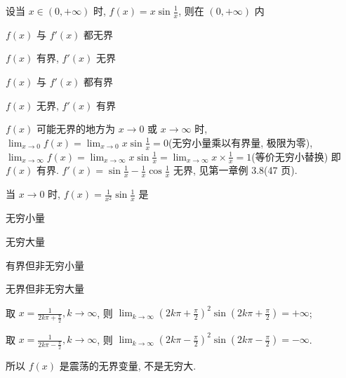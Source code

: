\begin{question}
  设当 $x \in(0,+\infty)$ 时, $f(x) = x \sin \frac{1}{x}$,
  则在 $(0,+\infty)$ 内
  \paren[B]
  \begin{choices}
    \item $f(x)$ 与 $f'(x)$ 都无界
    \item $f(x)$ 有界, $f'(x)$ 无界
    \item $f(x)$ 与 $f'(x)$ 都有界
    \item $f(x)$ 无界, $f'(x)$ 有界
  \end{choices}
\end{question}

\begin{analysis}
  $f(x)$ 可能无界的地方为 $x \to 0$ 或 $x \to \infty$ 时, $\lim_{x \to 0} f(x) = \lim_{x \to 0} x \sin \frac{1}{x} = 0$(无穷小量乘以有界量,
  极限为零),
  $\lim_{x \to \infty} f(x) = \lim_{x \to \infty} x \sin \frac{1}{x} = \lim_{x \to \infty} x \times \frac{1}{x} = 1$(等价无穷小替换)
  即 $f(x)$ 有界.
  $f'(x) = \sin \frac{1}{x} - \frac{1}{x} \cos \frac{1}{x}$ 无界,
  见第一章例 3.8(47 页).
\end{analysis}

\begin{question}
  当 $x \to 0$ 时, $f(x)= \frac{1}{x^{2}} \sin \frac{1}{x}$ 是
  \paren[D]
  \begin{choices}
    \item 无穷小量
    \item 无穷大量
    \item 有界但非无穷小量
    \item 无界但非无穷大量
  \end{choices}
\end{question}

\begin{analysis}
  取 $x= \frac{1}{2 k \pi+\frac{\pi}{2}}, k \to \infty$,
  则 $\lim_{k \to \infty}\left(2 k \pi+\frac{\pi}{2}\right)^{2} \sin \left(2 k \pi+\frac{\pi}{2}\right) = +\infty$;

  取 $x= \frac{1}{2 k \pi-\frac{\pi}{2}}, k \to \infty$,
  则 $\lim_{k \to \infty}\left(2 k \pi-\frac{\pi}{2}\right)^{2} \sin \left(2 k \pi-\frac{\pi}{2}\right)= -\infty$.

  所以 $f(x)$ 是震荡的无界变量,
  不是无穷大.
\end{analysis}

